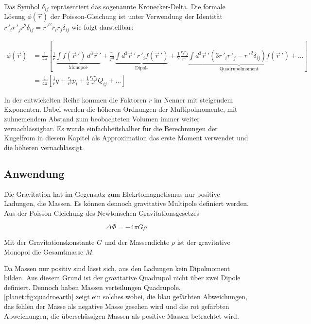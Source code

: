 \noindent
Das Symbol \(\delta_{ij}\) repräsentiert das sogenannte Kronecker-Delta.
Die formale Lösung \(\phi (\vec{r})\) der Poisson-Gleichung ist unter Verwendung der Identität \(r\,'_{i} r\,'_{j} r^{2} \delta_{ij} = r\,'^{2} r_{i} r_{j} \delta_{ij}\) wie folgt darstellbar:

\begin{equation*}
\begin{aligned}
\phi (\vec{r}) &= \frac{1}{4\pi} \left[ \frac{1}{r} \underbrace{\int f (\vec{r}\,') \, d^3 \vec{r}\,'}_{\text{Monopol-}} + \frac{r_{i}}{r^{3}} \underbrace{\int d^3 \vec{r}\,' \, r\,'_{i} f (\vec{r}\,')}_{\text{Dipol-}} + \frac{1}{2} \frac{r_{i} r_{j}}{r^{5}} \underbrace{\int d^3 \vec{r}\,' \left( 3 r\,'_{i} r\,'_{j} - r\,'^{2} \delta_{ij} \right) f (\vec{r}\,')}_{\text{Quadrupolmoment}} + \dots \right] \\
&= \frac{1}{4\pi} \left[ \frac{1}{r} q + \frac{r_{i}}{r^{3}} p_{i} + \frac{1}{2} \frac{r_{i} r_{j}}{r^{5}} Q_{ij} + \dots \right]
\end{aligned}
\end{equation*}

In der entwickelten Reihe kommen die Faktoren \(r\) im Nenner mit steigendem Exponenten.
Dabei werden die höheren Ordnungen der Multipolmomente, mit zuhnemendem Abstand zum beobachteten Volumen immer weiter vernachlässigbar.
Es wurde einfachheitshalber für die Berechnungen der Kugelfrom in diesem Kapitel als Approximation das erste Moment verwendet und die höheren vernachlässigt.



\subsection{Anwendung
\label{planet:subsection:anwendung}}

Die Gravitation hat im Gegensatz zum Elekrtomagnetismus nur positive Ladungen, die Massen.
Es können dennoch gravitative Multipole definiert werden.
Aus der Poisson-Gleichung des Newtonschen Gravitationsgesetzes

\begin{equation}
    \Delta \Phi = -4\pi G\rho
\end{equation}

\noindent
Mit der Gravitationskonstante \(G\) und der Massendichte \(\rho\) ist der gravitative Monopol die Gesamtmasse \(M\).

Da Massen nur positiv sind lässt sich, aus den Ladungen kein Dipolmoment bilden.
Aus diesem Grund ist der gravitative Quadrupol nicht über zwei Dipole definiert.
Dennoch haben Massen verteilungen Quadrupole.
\cref{planet:fig:quadroearth} zeigt ein solches wobei, die blau gefärbten Abweichungen, das fehlen der Masse als negative Masse gesehen wird und die rot gefärbten Abweichungen, die überschüssigen Massen als positive Massen betrachtet wird.  

